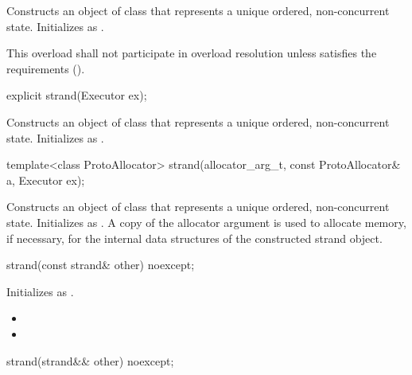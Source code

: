 \begin{itemdescr}
\pnum
\effects Constructs an object of class  that represents a unique ordered, non-concurrent state. Initializes  as .

\pnum
\remarks This overload shall not participate in overload resolution unless  satisfies the  requirements ().
\end{itemdescr}

\begin{itemdecl}
explicit strand(Executor ex);
\end{itemdecl}

\begin{itemdescr}
\pnum
\effects Constructs an object of class  that represents a unique ordered, non-concurrent state. Initializes  as .
\end{itemdescr}

\begin{itemdecl}
template<class ProtoAllocator>
  strand(allocator_arg_t, const ProtoAllocator& a, Executor ex);
\end{itemdecl}

\begin{itemdescr}
\pnum
\effects Constructs an object of class  that represents a unique ordered, non-concurrent state. Initializes  as . A copy of the allocator argument  is used to allocate memory, if necessary, for the internal data structures of the constructed strand object.
\end{itemdescr}

\begin{itemdecl}
strand(const strand& other) noexcept;
\end{itemdecl}

\begin{itemdescr}
\pnum
\effects Initializes  as .

\pnum
\postconditions
\begin{itemize}
\item
{}
\item
{}
\end{itemize}
\end{itemdescr}

\begin{itemdecl}
strand(strand&& other) noexcept;
\end{itemdecl}

